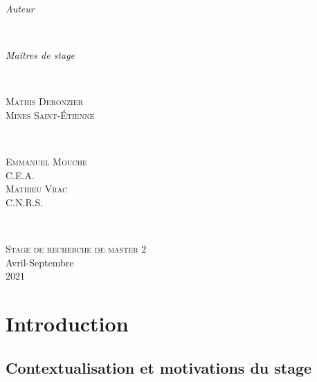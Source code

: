 \documentclass[a4paper,11pt]{article}
\numberwithin{equation}{section}
\begin{document}
	\begin{center}
	\begin{minipage}{0.4\textwidth}
		\begin{flushleft} \Large
			\emph{Auteur}\\
		\end{flushleft}
	\end{minipage}
	~
	\begin{minipage}{0.4\textwidth}
		\begin{flushright} \Large
			\emph{Maîtres de stage} \\
		\end{flushright}
	\end{minipage}\\[0.5 cm]
	\begin{minipage}{0.4\textwidth}
		\begin{flushleft} \large
			\textsc{Mathis Deronzier}\\
			\textsc{Mines Saint-Étienne}
		\end{flushleft}
	\end{minipage}
	~
	\begin{minipage}{0.4\textwidth}
		\begin{flushright} \large
			\textsc{Emmanuel Mouche}\\
			\textsc{C.E.A.}\\
			\textsc{Mathieu Vrac}\\
			\textsc{C.N.R.S.}
		\end{flushright}
	\end{minipage}\\[2cm]
	\end{center}
	\begin{center}
		\textsc{\Large Stage de recherche de master 2}\\[0.5cm]  
		\large Avril-Septembre\\2021\\[2cm]
	\end{center}

\newpage
\tableofcontents

\newpage
\section{Introduction}
\label{ch:introduction}

\subsection{Contextualisation et motivations du stage}
\label{ch:Contextualisation et motivations du stage}
\end{document}

